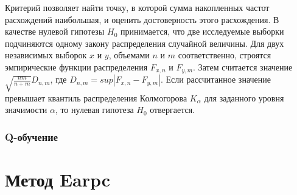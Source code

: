Критерий позволяет найти точку, в которой сумма накопленных частот расхождений наибольшая, и оценить достоверность этого расхождения. В качестве нулевой гипотезы $H_0$ принимается, что две исследуемые выборки подчиняются одному закону распределения случайной величины. Для двух независимых выборок $x$ и $y$, объемами $n$ и $m$ соответственно, строятся эмпирические функции распределения $F_{x, n}$ и $F_{y, m}$. Затем считается значение $\sqrt{\frac{nm}{n + m}}D_{n, m}$, где $D_{n, m} = sup|F_{x, n} - F_{y, m}|$. Если рассчитанное значение превышает квантиль распределения Колмогорова $K_{\alpha}$ для заданного уровня значимости $\alpha$, то нулевая гипотеза $H_0$ отвергается. 

\subsubsection{Q-обучение}

\section{Метод Earpc}

